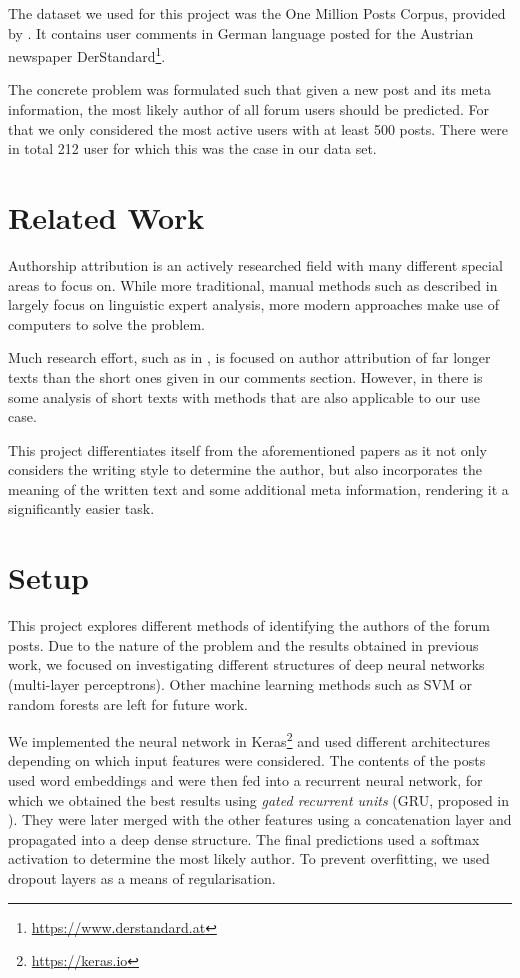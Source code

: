 \documentclass[acmsmall]{acmart}
\begin{document}
The dataset we used for this project was the One Million Posts Corpus, provided by \cite{MillionPosts}. It contains user comments in German language posted for the Austrian newspaper DerStandard\footnote{\url{https://www.derstandard.at}}.

The concrete problem was formulated such that given a new post and its meta information, the most likely author of all forum users should be predicted. For that we only considered the most active users with at least 500 posts. There were in total 212 user for which this was the case in our data set.

\section{Related Work}

Authorship attribution is an actively researched field with many different special areas to focus on. While more traditional, manual methods such as described in \cite{criminalForensics} largely focus on linguistic expert analysis, more modern approaches make use of computers to solve the problem.

Much research effort, such as in \cite{rexha2015towards,sanderson2006short}, is focused on author attribution of far longer texts than the short ones given in our comments section. However, in \cite{smith2009authorship,macleod2012whose} there is some analysis of short texts with methods that are also applicable to our use case. 

This project differentiates itself from the aforementioned papers as it not only considers the writing style to determine the author, but also incorporates the meaning of the written text and some additional meta information, rendering it a significantly easier task.

\section{Setup}

This project explores different methods of identifying the authors of the forum posts. Due to the nature of the problem and the results obtained in previous work, we focused on investigating different structures of deep neural networks (multi-layer perceptrons). Other machine learning methods such as SVM or random forests are left for future work.

We implemented the neural network in Keras\footnote{\url{https://keras.io}} and used different architectures depending on which input features were considered. The contents of the posts used word embeddings and were then fed into a recurrent neural network, for which we obtained the best results using \textit{gated recurrent units} (GRU, proposed in \cite{gru}). They were later merged with the other features using a concatenation layer and propagated into a deep dense structure. The final predictions used a softmax activation to determine the most likely author. To prevent overfitting, we used dropout layers as a means of regularisation.
\end{document}

